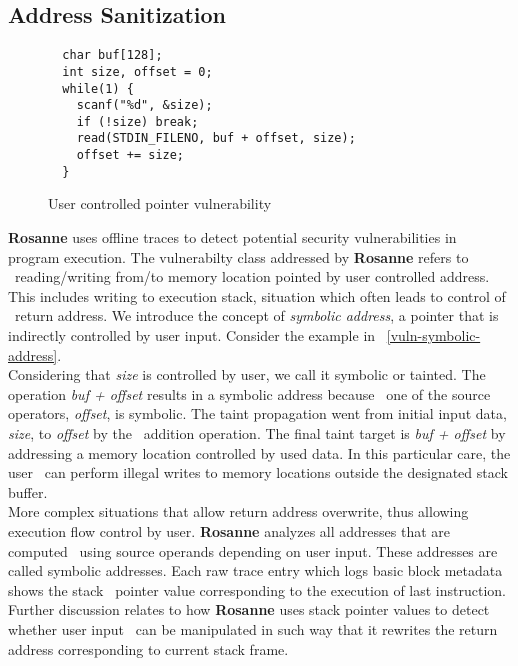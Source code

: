 \documentclass[format=acmsmall]{acmart}
\newcommand{\allcaps}[1]{\texorpdfstring{\textsmaller[.5]{#1}}{#1}\xspace}
\newcommand{\tool}{\textbf{Rosanne}}
\newcommand{\river}{\allcaps{RIVER}}
\begin{document}
\subsection{Address Sanitization}

\begin{figure}
\caption{User controlled pointer vulnerability}
\label{vuln-symbolic-address}
\begin{lstlisting}
  char buf[128];
  int size, offset = 0;
  while(1) {
    scanf("%d", &size);
    if (!size) break;
    read(STDIN_FILENO, buf + offset, size);
    offset += size;
  }
\end{lstlisting}
\end{figure}

{\tool} uses {\river} offline traces to detect potential security vulnerabilities in program execution. The vulnerabilty class addressed by {\tool} refers to \
reading/writing from/to memory location pointed by user controlled address. This includes writing to execution stack, situation which often leads to control of \
return address. We introduce the concept of \textit{symbolic address}, a pointer that is indirectly controlled by user input. Consider the example in \
\autoref{vuln-symbolic-address}. \\

Considering that \textit{size} is controlled by user, we call it symbolic or tainted. The operation \textit{buf + offset} results in a symbolic address because \
one of the source operators, \textit{offset}, is symbolic. The taint propagation went from initial input data, \textit{size}, to \textit{offset} by the \
addition operation. The final taint target is \textit{buf + offset} by addressing a memory location controlled by used data. In this particular care, the user \
can perform illegal writes to memory locations outside the designated stack buffer. \\

More complex situations that allow return address overwrite, thus allowing execution flow control by user. {\tool} analyzes all addresses that are computed \
using source operands depending on user input. These addresses are called symbolic addresses. Each raw trace entry which logs basic block metadata shows the stack \
pointer value corresponding to the execution of last instruction. Further discussion relates to how {\tool} uses stack pointer values to detect whether user input \
can be manipulated in such way that it rewrites the return address corresponding to current stack frame. \\



%
%



\end{document}
